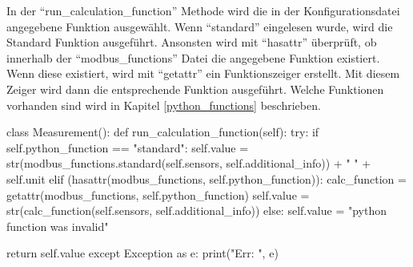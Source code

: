 In der \enquote{run\_calculation\_function} Methode wird die in der Konfigurationsdatei angegebene Funktion ausgewählt. Wenn \enquote{standard} eingelesen wurde, wird die Standard Funktion ausgeführt. Ansonsten wird mit \enquote{hasattr} überprüft, ob innerhalb der \enquote{modbus\_functions} Datei die angegebene Funktion existiert. Wenn diese existiert, wird mit \enquote{getattr} ein Funktionszeiger erstellt. Mit diesem Zeiger wird dann die entsprechende Funktion ausgeführt. Welche Funktionen vorhanden sind wird in Kapitel \ref{python_functions} beschrieben. 

\begin{pythoncode}
class Measurement():
	def run_calculation_function(self):
		try:
			if self.python_function == "standard":
				self.value = str(modbus_functions.standard(self.sensors, self.additional_info)) + " " + self.unit
			elif (hasattr(modbus_functions, self.python_function)):
				calc_function = getattr(modbus_functions, self.python_function)
				self.value = str(calc_function(self.sensors, self.additional_info))
			else:
				self.value = "python function was invalid"
		
			return self.value
		except Exception as e:
			print("Err: ", e)
\end{pythoncode}
